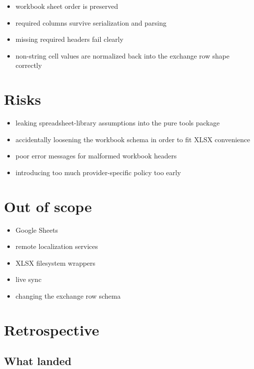 \begin{itemize}
\tightlist
\item
  workbook sheet order is preserved
\item
  required columns survive serialization and parsing
\item
  missing required headers fail clearly
\item
  non-string cell values are normalized back into the exchange row shape correctly
\end{itemize}

\section{Risks}\label{record-193-risks}

\begin{itemize}
\tightlist
\item
  leaking spreadsheet-library assumptions into the pure tools package
\item
  accidentally loosening the workbook schema in order to fit XLSX convenience
\item
  poor error messages for malformed workbook headers
\item
  introducing too much provider-specific policy too early
\end{itemize}

\section{Out of scope}\label{record-193-out-of-scope}

\begin{itemize}
\tightlist
\item
  Google Sheets
\item
  remote localization services
\item
  XLSX filesystem wrappers
\item
  live sync
\item
  changing the exchange row schema
\end{itemize}

\section{Retrospective}\label{record-193-retrospective}

\subsection{What landed}\label{record-193-what-landed}

